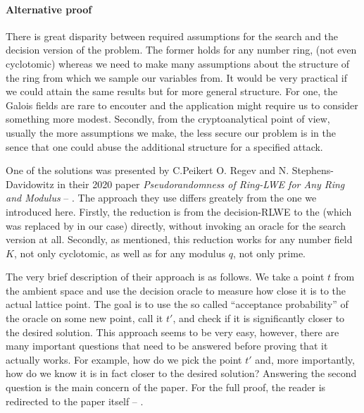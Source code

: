 \paragraph{Alternative proof}
There is great disparity between required assumptions for the search and the decision version of the problem. The former holds for any number ring, (not even cyclotomic) whereas we need to make many assumptions about the structure of the ring from which we sample our variables from. It would be very practical if we could attain the same results but for more general structure. For one, the Galois fields are rare to encouter and the application might require us to consider something more modest. Secondly, from the cryptoanalytical point of view, usually the more assumptions we make, the less secure our problem is in the sence that one could abuse the additional structure for a specified attack.

One of the solutions was presented by C.Peikert O. Regev and N. Stephens-Davidowitz in their 2020 paper \textit{Pseudorandomness of Ring-LWE for Any Ring and Modulus} -- \cite{oracle}. The approach they use differs greately from the one we introduced here. Firstly, the reduction is from the decision-RLWE to the  (which was replaced by  in our case) directly, without invoking an oracle for the search version at all. Secondly, as mentioned, this reduction works for any number field $K$, not only cyclotomic, as well as for any modulus $q$, not only prime.

The very brief description of their approach is as follows. We take a point $t$ from the ambient space and use the decision oracle to measure how close it is to the actual lattice point. The goal is to use the so called ``acceptance probability'' of the oracle on some new point, call it $t'$, and check if it is significantly closer to the desired solution. This approach seems to be very easy, however, there are many important questions that need to be answered before proving that it actually works. For example, how do we pick the point $t'$ and, more importantly, how do we know it is in fact closer to the desired solution? Answering the second question is the main concern of the paper. For the full proof, the reader is redirected to the paper itself -- \cite{oracle}.
